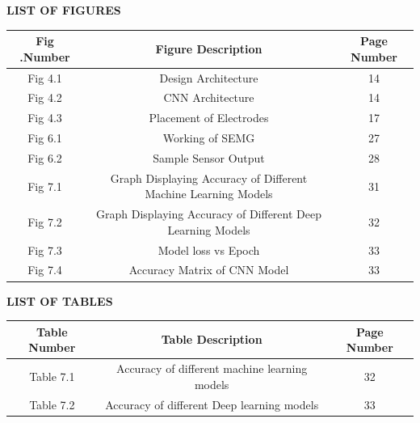 \documentclass[ 12pt,a4paper,twocolumn,fleqn]{report}
\begin{document}
\newpage
  \pagestyle{fancy}
\thisfancypage{%
  \setlength{\fboxsep}{20pt}\doublebox}{}
\begin{center}
\huge\textbf{LIST OF FIGURES}
\end{center}
\vspace{15mm}
\begin{center}
    \begin{tabular}{|c|c|c|}
     \hline
     Fig .Number & Figure Description & Page Number \\
     \hline
     Fig 4.1 &Design Architecture & 14 \\
     \hline
     Fig 4.2 &CNN Architecture& 14 \\
     \hline
     Fig 4.3 &Placement of Electrodes& 17\\
     \hline
     Fig 6.1  &Working of SEMG& 27\\
     \hline
      Fig 6.2  &Sample Sensor Output& 28\\
     \hline
     Fig 7.1 &Graph Displaying Accuracy of Different Machine Learning Models & 31 \\
     \hline
     Fig 7.2& Graph Displaying Accuracy of Different Deep Learning Models
&32 \\
     \hline
     Fig 7.3 &Model loss vs Epoch & 33 \\
     \hline
     Fig 7.4& Accuracy Matrix of CNN Model & 33\\
     \hline
    \end{tabular}
\end{center}

\newpage
  \pagestyle{fancy}
\thisfancypage{%
  \setlength{\fboxsep}{20pt}\doublebox}{}
\begin{center}
\huge\textbf{LIST OF TABLES}
\end{center}
\vspace{15mm}
\begin{center}
    \begin{tabular}{|c|c|c|}
     \hline
     Table Number &Table Description &Page Number \\
     \hline
     Table 7.1 &Accuracy of different machine learning
models
& 32 \\
     \hline
     Table 7.2 &Accuracy of different Deep learning
models
& 33 \\
     \hline
    \end{tabular}
\end{center}
\end{document}
